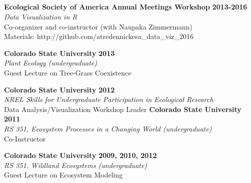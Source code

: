 \documentclass[margin,line]{resume}
\begin{document}
\begin{resume}
    
     \section{\textmd{\textsf{\color{MidnightBlue}{Teaching\\Experience}}}}
    \textbf{Ecological Society of America Annual Meetings Workshop} \hfill \textbf{2013-2016}\\
    		\textsl{Data Visualization in R}\\
		Co-organizer and co-instructor (with Naupaka Zimmermann)\\
		Materials: http://github.com/atredennickesa\_data\_viz\_2016
		

    
    \textbf{Colorado State University} \hfill \textbf{2013}\\
               \textsl{Plant Ecology (undergraduate)}\\
               Guest Lecture on Tree-Grass Coexistence
               
    \textbf{Colorado State University} \hfill \textbf{2012}\\ 
               \textsl{NREL Skills for Undergraduate Participation in Ecological Research}\\
               Data Analysis/Visualization Workshop Leader
               		      \newpage{}
    \textbf{Colorado State University} \hfill \textbf{2011}\\ 
               \textsl{RS 351, Ecosystem Processes in a Changing World (undergraduate)}\\
               Co-Instructor 

    \textbf{Colorado State University} \hfill \textbf{2009, 2010, 2012}\\ 
               \textsl{RS 351, Wildland Ecosystems (undergraduate)}\\
               Guest Lecture on Ecosystem Modeling
               

\end{resume}
\end{document}

